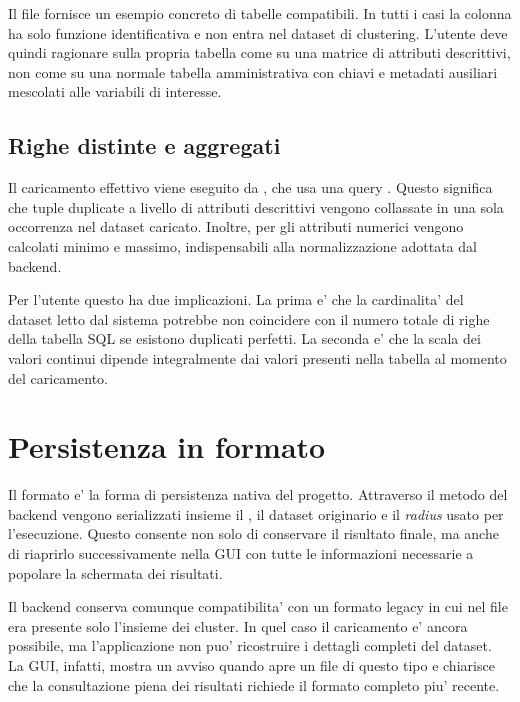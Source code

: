 Il file  fornisce un esempio concreto di tabelle
compatibili. In tutti i casi la colonna  ha solo funzione identificativa e non
entra nel dataset di clustering. L'utente deve quindi ragionare sulla propria tabella
come su una matrice di attributi descrittivi, non come su una normale tabella
amministrativa con chiavi e metadati ausiliari mescolati alle variabili di interesse.

\subsection{Righe distinte e aggregati}

Il caricamento effettivo viene eseguito da , che usa una query
. Questo significa che tuple duplicate a livello di attributi
descrittivi vengono collassate in una sola occorrenza nel dataset caricato. Inoltre, per
gli attributi numerici vengono calcolati minimo e massimo, indispensabili alla
normalizzazione adottata dal backend.

Per l'utente questo ha due implicazioni. La prima e' che la cardinalita' del dataset
letto dal sistema potrebbe non coincidere con il numero totale di righe della tabella SQL
se esistono duplicati perfetti. La seconda e' che la scala dei valori continui dipende
integralmente dai valori presenti nella tabella al momento del caricamento.

\section{Persistenza in formato }

Il formato  e' la forma di persistenza nativa del progetto. Attraverso il
metodo  del backend vengono serializzati insieme il
, il dataset originario e il \emph{radius} usato per l'esecuzione.
Questo consente non solo di conservare il risultato finale, ma anche di riaprirlo
successivamente nella GUI con tutte le informazioni necessarie a popolare la schermata
dei risultati.

Il backend conserva comunque compatibilita' con un formato legacy in cui nel file era
presente solo l'insieme dei cluster. In quel caso il caricamento e' ancora possibile, ma
l'applicazione non puo' ricostruire i dettagli completi del dataset. La GUI, infatti,
mostra un avviso quando apre un file di questo tipo e chiarisce che la consultazione
piena dei risultati richiede il formato completo piu' recente.

